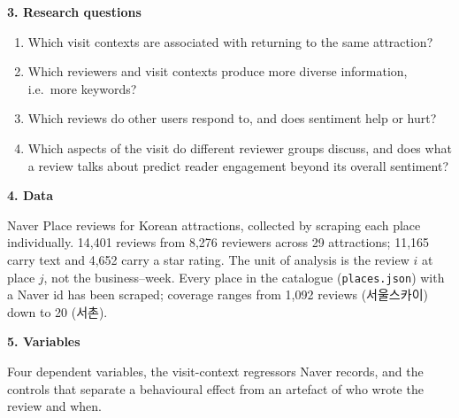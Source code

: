 \documentclass[10pt,a4paper]{article}
\newcommand{\sect}[1]{\vspace{3pt}\noindent\textbf{#1}\par\vspace{1pt}}
\begin{document}
\sect{3. Research questions}
\begin{enumerate}[leftmargin=14pt, itemsep=0pt, topsep=1pt]
\item Which visit contexts are associated with returning to the same attraction?
\item Which reviewers and visit contexts produce more diverse information, i.e.\ more keywords?
\item Which reviews do other users respond to, and does sentiment help or hurt?
\item Which aspects of the visit do different reviewer groups discuss, and does what a review
      talks about predict reader engagement beyond its overall sentiment?
\end{enumerate}

\sect{4. Data}
Naver Place reviews for Korean attractions, collected by scraping each place individually.
14{,}401 reviews from 8{,}276 reviewers across 29 attractions; 11{,}165 carry text and 4{,}652 carry a
star rating. The unit of analysis is the review $i$ at place $j$, not the business--week. Every
place in the catalogue (\texttt{places.json}) with a Naver id has been scraped; coverage ranges from
1{,}092 reviews (서울스카이) down to 20 (서촌).

\tblPlaces




\clearpage
\sect{5. Variables}
Four dependent variables, the visit-context regressors Naver records, and the controls that
separate a behavioural effect from an artefact of who wrote the review and when.


\tblVariables
\end{document}
